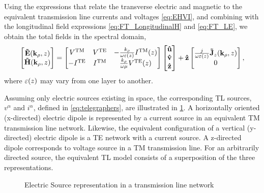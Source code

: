 Using the expressions that relate the transverse electric and magnetic to the equivalent transmission line currents and voltages \eqref{eq:EHVI}, and combining with the longitudinal field expressions \eqref{eq:FT_LongitudinalH} and \eqref{eq:FT_LE}, we obtain the total fields in the spectral domain,
%
%
\begin{equation}
  \begin{bmatrix}
    \mathbf{\tilde{E}}(\mathbf{k}_{\rho},z) \\
    \mathbf{\tilde{H}}(\mathbf{k}_{\rho},z)
  \end{bmatrix}
  =
  \begin{bmatrix}
    V^{\mathrm{TM}} & V^{\mathrm{TE}} & -\frac{k_{\rho}}{\omega \varepsilon(z)}   I^{\mathrm{TM}}(z) \\
    -I^{\mathrm{TE}} & I^{\mathrm{TM}} & \frac{k_{\rho}}{\omega \mu}   V^{\mathrm{TE}}(z)
  \end{bmatrix}
  \begin{bmatrix}
    \mathbf{\hat u} \\
    \mathbf{\hat v} \\
    \mathbf{\hat z} \\
  \end{bmatrix} + \mathbf{\hat z}
  \begin{bmatrix}
    \frac{{j}\mkern1mu}{\omega \varepsilon(z)}     \mathbf{\tilde{J}}_z(\mathbf{k}_{\rho},z) \\
    0
  \end{bmatrix}
  \label{eq:totalEHVI},
\end{equation}
%
where $\varepsilon(z)$ may vary from one layer to another.

Assuming only electric sources existing in space, the corresponding TL sources, $v^{\alpha}$ and $i^{\alpha}$, defined in \eqref{eq:telegraphers}, are illustrated in \ref{fig:J_sources}. A horizontally oriented (x-directed) electric dipole is represented by a current source in an equivalent TM transmission line network. Likewise, the equivalent configuration of a vertical (y-directed) electric dipole is a TE network with a current source. A z-directed dipole corresponds to voltage source in a TM transmission line. For an arbitrarily directed source, the equivalent TL model consists of a superposition of the three representations.
%
\begin{figure}[h!]
  \centering
  \def\svgwidth{.75\linewidth}
  
  \caption{Electric Source representation in a transmission line network}
  \label{fig:J_sources}
\end{figure}
%
